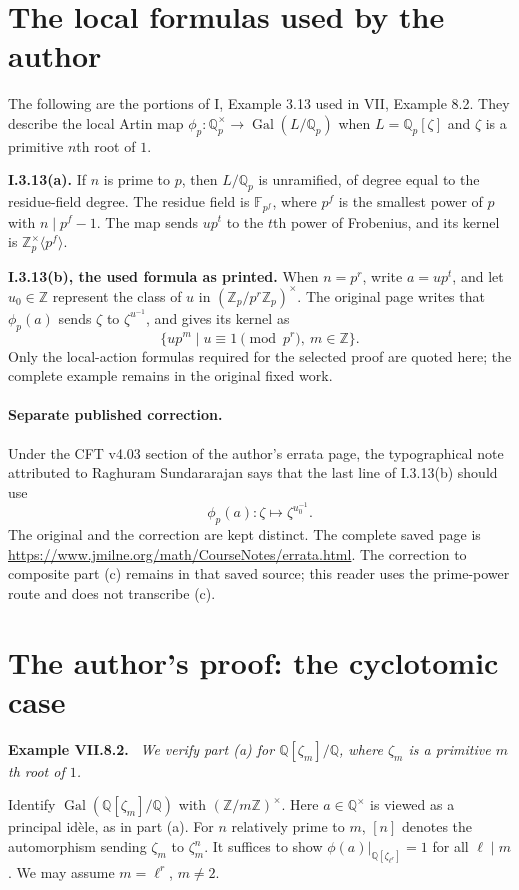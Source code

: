 \documentclass[11pt]{article}
\newcommand{\Q}{\mathbb Q}
\newcommand{\Z}{\mathbb Z}
\newcommand{\Gal}{\operatorname{Gal}}
\newenvironment{authorresult}[2]{\par\medskip\noindent\textbf{#1 VII.#2.}\ \itshape}{\par\medskip}
\begin{document}
\section*{The local formulas used by the author}
The following are the portions of I, Example 3.13 used in VII, Example 8.2.
They describe the local Artin map $\phi_p:\Q_p^\times\to\Gal(L/\Q_p)$
when $L=\Q_p[\zeta]$ and $\zeta$ is a primitive $n$th root of $1$.

\noindent\textbf{I.3.13(a).}
If $n$ is prime to $p$, then $L/\Q_p$ is unramified, of degree equal to the
residue-field degree. The residue field is $\mathbb F_{p^f}$, where $p^f$
is the smallest power of $p$ with $n\mid p^f-1$.
The map sends $u p^t$ to the $t$th power of Frobenius, and its kernel is
$\Z_p^\times\langle p^f\rangle$.

\noindent\textbf{I.3.13(b), the used formula as printed.}
When $n=p^r$, write $a=u p^t$, and let $u_0\in\Z$ represent the class of
$u$ in $(\Z_p/p^r\Z_p)^\times$. The original page writes that
$\phi_p(a)$ sends $\zeta$ to $\zeta^{u^{-1}}$, and gives its kernel as
\[
 \{u p^m\mid u\equiv1\pmod{p^r},\ m\in\Z\}.
\]
Only the local-action formulas required for the selected proof are quoted
here; the complete example remains in the original fixed work.

\paragraph{Separate published correction.}
Under the CFT v4.03 section of the author's errata page, the typographical
note attributed to Raghuram Sundararajan says that the last line of
I.3.13(b) should use
\[
 \phi_p(a):\zeta\longmapsto\zeta^{u_0^{-1}}.
\]
The original and the correction are kept distinct.
The complete saved page is \url{https://www.jmilne.org/math/CourseNotes/errata.html}.
The correction to composite part (c) remains in that saved source; this
reader uses the prime-power route and does not transcribe (c).

\section*{The author's proof: the cyclotomic case}
\begin{authorresult}{Example}{8.2}
We verify part (a) for $\Q[\zeta_m]/\Q$, where $\zeta_m$ is a primitive
$m$th root of $1$.
\end{authorresult}
Identify $\Gal(\Q[\zeta_m]/\Q)$ with $(\Z/m\Z)^\times$.
Here $a\in\Q^\times$ is viewed as a principal id\`ele, as in part (a).
For $n$ relatively prime to $m$, $[n]$ denotes the automorphism sending
$\zeta_m$ to $\zeta_m^n$. It suffices to show
$\phi(a)|_{\Q[\zeta_{\ell^r}]}=1$ for all $\ell\mid m$.
We may assume $m=\ell^r$, $m\ne2$.
\end{document}
